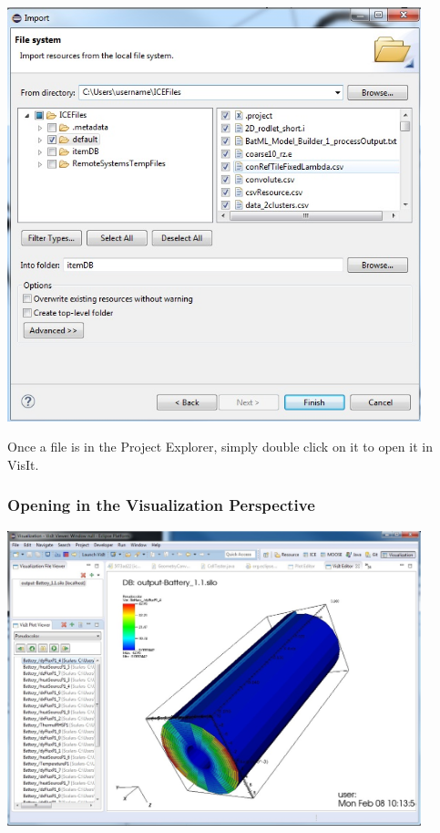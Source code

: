 \begin{center}
\includegraphics[width=12cm]{images/ImportFileDialog}
\end{center}

Once a file is in the Project Explorer, simply double click on it to open it in
VisIt.

\subsubsection{Opening in the Visualization Perspective}

\begin{center}
\includegraphics[width=12cm]{images/VisualizationPerspectiveOverview}
\end{center}

